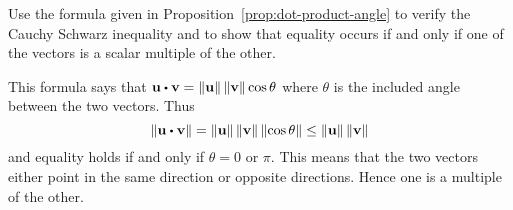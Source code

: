 \begin{ex}
  Use the formula given in Proposition~\ref{prop:dot-product-angle} to
  verify the Cauchy Schwarz inequality and to show that equality
  occurs if and only if one of the vectors is a scalar multiple of the
  other.
  \begin{sol}
    This formula says that
    $\vect{u}\dotprod \vect{v}=\norm{ \vect{u}} \norm{\vect{v}} \cos
    \theta$ where $ \theta $ is the included angle between the two
    vectors. Thus
    \begin{equation*}
      \norm{\vect{u}\dotprod \vect{v}} =\norm{\vect{u}}
      \norm{\vect{v}} \norm{\cos \theta} \leq
      \norm{\vect{u}} \norm{\vect{v}}
    \end{equation*}
    and equality holds if and only if $\theta =0$ or $\pi$. This means
    that the two vectors either point in the same direction or
    opposite directions. Hence one is a multiple of the other.
  \end{sol}
\end{ex}
